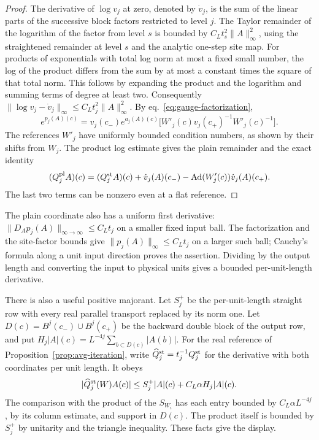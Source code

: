 \documentclass[11pt,letterpaper,reqno]{amsart}
\numberwithin{equation}{section}
\renewcommand{\eqref}[1]{\textup{eq.~\ref{#1}}}
\theoremstyle{definition}
\theoremstyle{remark}
\begin{document}
\begin{proof}
The derivative of \(\log v_j\) at zero, denoted by \(\dot v_j\),
is the sum of the linear parts of the successive block factors
restricted to level \(j\). The Taylor remainder of the logarithm
of the factor from level \(s\) is bounded by
\(C_L t_s^2\|A\|_\infty^2\), using the straightened remainder
at level \(s\) and the analytic one-step site map. For products
of exponentials with total log norm at most a fixed small
number, the log of the product differs from the sum by at
most a constant times the square of that total norm. This
follows by expanding the product and the logarithm and
summing terms of degree at least two. Consequently
\(\|\log v_j-\dot v_j\|_\infty\leq C_Lt_j^2\|A\|_\infty^2\).
By \eqref{eq:gauge-factorization},
\[
 e^{p_j(A)(c)}
 =v_j(c_-) e^{a_j(A)(c)}
      \bigl[W'_j(c)v_j(c_+)^{-1}W'_j(c)^{-1}\bigr].
\]
The references \(W'_j\) have uniformly bounded condition numbers,
as shown by their shifts from \(W_j\).
The product log estimate gives the plain remainder and the exact
identity
\begin{equation}
 (Q_j^{\rm pl}A)(c)
  =(Q_j^{\rm st}A)(c)+\dot v_j(A)(c_-)
               -\operatorname{Ad}(W'_j(c))\dot v_j(A)(c_+).
 \label{eq:avg-plain-st}
\end{equation}
The last two terms can be nonzero even at a flat reference.
\end{proof}

The plain coordinate also has a uniform first derivative:
$\|D_Ap_j(A)\|_{\infty\to\infty}\le C_Lt_j$ on a smaller
fixed input ball. The factorization and the site-factor bounds
give $\|p_j(A)\|_\infty\le C_Lt_j$ on a larger such ball;
Cauchy's formula along a unit input direction proves the assertion.
Dividing by the output length and converting the input to physical
units gives a bounded per-unit-length derivative.

There is also a useful positive majorant. Let $S_j^+$ be the
per-unit-length straight row with every real parallel transport
replaced by its norm one. Let $D(c)=B^j(c_-)\cup B^j(c_+)$ be
the backward double block of the output row, and put
$H_j|A|(c)=L^{-4j}\sum_{b\subset D(c)}|A(b)|$.
For the real reference of Proposition~\ref{prop:avg-iteration},
write $\widehat Q_j^{\rm st}=t_j^{-1}Q_j^{\rm st}$ for the
derivative with both coordinates per unit length. It obeys
\begin{equation}\label{eq:avg-positive-majorant}
 |\widehat Q_j^{\rm st}(W)A(c)|
       \le S_j^+|A|(c)+C_L\alpha H_j|A|(c).
\end{equation}
The comparison with the product of the $S_{W_i}$ has each entry
bounded by $C_L\alpha L^{-4j}$, by its column estimate, and
support in $D(c)$. The product itself is bounded by $S_j^+$ by
unitarity and the triangle inequality. These facts give the display.
\end{document}
